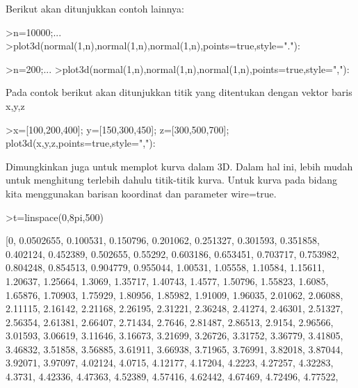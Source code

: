 \documentclass[a4paper,10pt]{article}
\begin{document}
\begin{eulernotebook}
\begin{eulercomment}
\begin{eulercomment}
\begin{eulercomment}
Berikut akan ditunjukkan contoh lainnya:
\end{eulercomment}
\begin{eulerprompt}
>n=10000;...
>plot3d(normal(1,n),normal(1,n),normal(1,n),points=true,style="."):
\end{eulerprompt}
\begin{eulerprompt}
>n=200;...
>plot3d(normal(1,n),normal(1,n),normal(1,n),points=true,style=","):
\end{eulerprompt}
\begin{eulercomment}
Pada contok berikut akan ditunjukkan titik yang ditentukan dengan
vektor baris x,y,z
\end{eulercomment}
\begin{eulerprompt}
>x=[100,200,400]; y=[150,300,450]; z=[300,500,700]; plot3d(x,y,z,points=true,style=","):
\end{eulerprompt}
\begin{eulercomment}
Dimungkinkan juga untuk memplot kurva dalam 3D. Dalam hal ini, lebih
mudah untuk menghitung terlebih dahulu titik-titik kurva. Untuk kurva
pada bidang kita menggunakan barisan koordinat dan parameter
wire=true.
\end{eulercomment}
\begin{eulerprompt}
>t=linspace(0,8pi,500)
\end{eulerprompt}
\begin{euleroutput}
  [0,  0.0502655,  0.100531,  0.150796,  0.201062,  0.251327,  0.301593,
  0.351858,  0.402124,  0.452389,  0.502655,  0.55292,  0.603186,
  0.653451,  0.703717,  0.753982,  0.804248,  0.854513,  0.904779,
  0.955044,  1.00531,  1.05558,  1.10584,  1.15611,  1.20637,  1.25664,
  1.3069,  1.35717,  1.40743,  1.4577,  1.50796,  1.55823,  1.6085,
  1.65876,  1.70903,  1.75929,  1.80956,  1.85982,  1.91009,  1.96035,
  2.01062,  2.06088,  2.11115,  2.16142,  2.21168,  2.26195,  2.31221,
  2.36248,  2.41274,  2.46301,  2.51327,  2.56354,  2.61381,  2.66407,
  2.71434,  2.7646,  2.81487,  2.86513,  2.9154,  2.96566,  3.01593,
  3.06619,  3.11646,  3.16673,  3.21699,  3.26726,  3.31752,  3.36779,
  3.41805,  3.46832,  3.51858,  3.56885,  3.61911,  3.66938,  3.71965,
  3.76991,  3.82018,  3.87044,  3.92071,  3.97097,  4.02124,  4.0715,
  4.12177,  4.17204,  4.2223,  4.27257,  4.32283,  4.3731,  4.42336,
  4.47363,  4.52389,  4.57416,  4.62442,  4.67469,  4.72496,  4.77522,

\end{euleroutput}
\end{eulercomment}
\end{eulercomment}
\end{eulernotebook}
\end{document}
